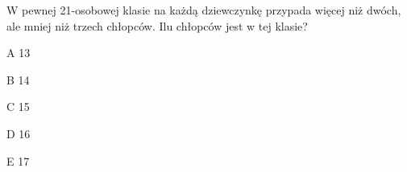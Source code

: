 \begin{tresc}
W pewnej 21-osobowej klasie na każdą dziewczynkę przypada więcej niż dwóch, ale mniej niż trzech chłopców. Ilu chłopców jest w tej klasie?
\end{tresc}
\begin{wariant}{A} 13 \end{wariant}
\begin{wariant}{B} 14 \end{wariant}
\begin{wariant}{C} 15 \end{wariant}
\begin{wariant}{D} 16 \end{wariant}
\begin{wariant}{E} 17 \end{wariant}
